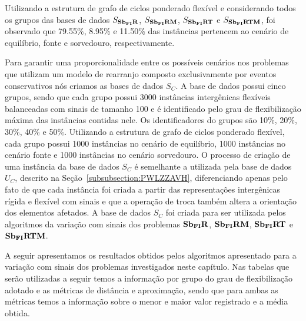 Utilizando a estrutura de grafo de ciclos ponderado flexível e considerando todos os grupos das bases de dados $S_{\textbf{Sb\textsubscript{FI}R}}{}$, $S_{\textbf{Sb\textsubscript{FI}RM}}{}$, $S_{\textbf{Sb\textsubscript{FI}RT}}{}$ e $S_{\textbf{Sb\textsubscript{FI}RTM}}{}$, foi observado que 79.55\%,  8.95\% e 11.50\% das instâncias pertencem ao cenário de equilíbrio, fonte e sorvedouro, respectivamente. 

Para garantir uma proporcionalidade entre os possíveis cenários nos problemas que utilizam um modelo de rearranjo composto exclusivamente por eventos conservativos nós criamos as bases de dados $S_{C}$. A base de dados possui cinco grupos, sendo que cada grupo possui 3000 instâncias intergênicas flexíveis balanceadas com sinais de tamanho 100 e é identificado pelo grau de flexibilização máxima das instâncias contidas nele. Os identificadores do grupos são 10\%, 20\%, 30\%, 40\% e 50\%. Utilizando a estrutura de grafo de ciclos ponderado flexível, cada grupo possui 1000 instâncias no cenário de equilíbrio, 1000 instâncias no cenário fonte e 1000 instâncias no cenário sorvedouro. O processo de criação de uma instância da base de dados $S_{C}$ é semelhante a utilizada pela base de dados $U_{C}$, descrito na Seção~\ref{subsubsection:PWLZZAVH}, diferenciando apenas pelo fato de que cada instância foi criada a partir das representações intergênicas rígida e flexível com sinais e que a operação de troca também altera a orientação dos elementos afetados. A base de dados $S_{C}$ foi criada para ser utilizada pelos algoritmos da variação com sinais dos problemas $\textbf{Sb\textsubscript{FI}R}{}$, $\textbf{Sb\textsubscript{FI}RM}{}$, $\textbf{Sb\textsubscript{FI}RT}{}$ e $\textbf{Sb\textsubscript{FI}RTM}{}$.

A seguir apresentamos os resultados obtidos pelos algoritmos apresentado para a variação com sinais dos problemas investigados neste capítulo. Nas tabelas que serão utilizadas a seguir temos a informação por grupo do grau de flexibilização adotado e as métricas de distância e aproximação, sendo que para ambas as métricas temos a informação sobre o menor e maior valor registrado e a média obtida.



% 





% 





% 



